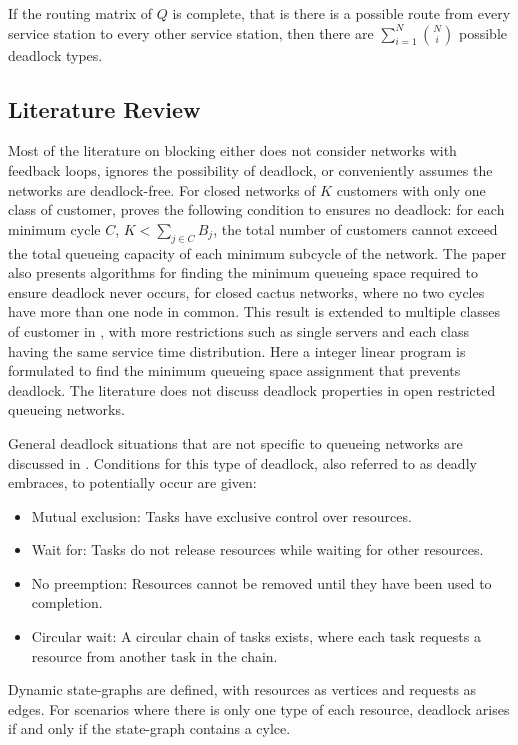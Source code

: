\documentclass{article}
\begin{document}
If the routing matrix of $Q$ is complete, that is there is a possible route from every service station to every other service station, then there are $\sum_{i=1}^N \binom{N}{i}$ possible deadlock types.

\subsection{Literature Review}

Most of the literature on blocking either does not consider networks with feedback loops, ignores the possibility of deadlock, or conveniently assumes the networks are
deadlock-free.
For closed networks of $K$ customers with only one class of customer, \cite{kunduakyildiz89} proves the following condition to ensures no deadlock: for each minimum cycle $C$, $K < \sum_{j\in C} B_j$, the total number of customers cannot exceed the total queueing capacity of each minimum subcycle of the network.
The paper also presents algorithms for finding the minimum queueing space required to ensure deadlock never occurs, for closed cactus networks, where no two cycles have more than one node in common.
This result is extended to multiple classes of customer in \cite{liebeherrakyildiz95}, with more restrictions such as single servers and each class having the same service time distribution.
Here a integer linear program is formulated to find the minimum queueing space assignment that prevents deadlock.
The literature does not discuss deadlock properties in open restricted queueing networks.

General deadlock situations that are not specific to queueing networks are discussed in \cite{coffmanelphick71}.
Conditions for this type of deadlock, also referred to as deadly embraces, to potentially occur are given:
\begin{itemize}
  \item Mutual exclusion: Tasks have exclusive control over resources.
  \item Wait for: Tasks do not release resources while waiting for other resources.
  \item No preemption: Resources cannot be removed until they have been used to completion.
  \item Circular wait: A circular chain of tasks exists, where each task requests a resource from another task in the chain.
\end{itemize}
Dynamic state-graphs are defined, with resources as vertices and requests as edges.
For scenarios where there is only one type of each resource, deadlock arises if and only if the state-graph contains a cylce.
\end{document}
